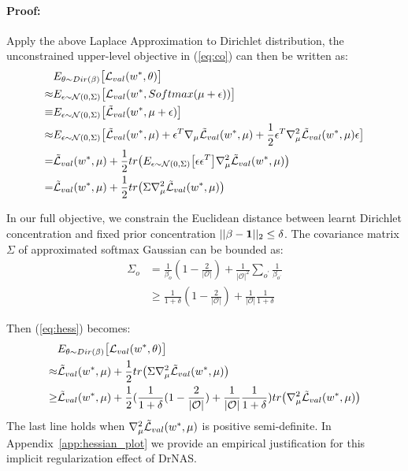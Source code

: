 \documentclass{article} \usepackage{iclr2021_conference,times}
\begin{document}
\paragraph{Proof:}
Apply the above Laplace Approximation to Dirichlet distribution, the unconstrained upper-level objective in (\ref{eq:co}) can then be written as:
\begin{align}
    \label{eq:hess}
    &E_{\theta \sim Dir(\beta)} \big{[}\mathcal{L}_{val} (w^*, \theta)\big{]}\\
    \approx &E_{\epsilon \sim \mathcal{N}(0, \Sigma)} \big{[}\mathcal{L}_{val} (w^*, Softmax(\mu + \epsilon))\big{]}\\
    \equiv &E_{\epsilon \sim \mathcal{N}(0, \Sigma)} \big{[}\mathcal{\Tilde{L}}_{val} (w^*, \mu + \epsilon)\big{]}\\
    \approx &E_{\epsilon \sim \mathcal{N}(0, \Sigma)} \big{[} \mathcal{\Tilde{L}}_{val} (w^*, \mu) + \epsilon^T \nabla_{\mu} \mathcal{\Tilde{L}}_{val} (w^*, \mu) + \frac{1}{2}\epsilon^T\nabla_{\mu}^2 \mathcal{\Tilde{L}}_{val} (w^*, \mu)\epsilon \big{]}\\
    = &\mathcal{\Tilde{L}}_{val} (w^*, \mu) + \frac{1}{2} tr\big{(}E_{\epsilon \sim \mathcal{N}(0, \Sigma)} \big{[} \epsilon\epsilon^T  \big{]} \nabla_{\mu}^2 \mathcal{\Tilde{L}}_{val} (w^*, \mu) \big{)}\\
    = &\mathcal{\Tilde{L}}_{val} (w^*, \mu) + \frac{1}{2} tr\big{(} \Sigma \nabla_{\mu}^2 \mathcal{\Tilde{L}}_{val} (w^*, \mu) \big{)}
\end{align}

In our full objective, we constrain the Euclidean distance between learnt Dirichlet concentration and fixed prior concentration $|| \beta - \bold{1} ||_2 \leq \delta$.
The covariance matrix $\Sigma$ of approximated softmax Gaussian can be bounded as:
\begin{align}
    \Sigma_o &= \frac{1}{\beta_o}(1 - \frac{2}{|\mathcal{O}|}) + \frac{1}{|\mathcal{O}|^2}\sum_{o^{'}} \frac{1}{\beta_{o^{'}}} \\
             &\geq \frac{1}{1 + \delta}(1 - \frac{2}{|\mathcal{O}|}) + \frac{1}{|\mathcal{O}|}\frac{1}{1 + \delta}
\end{align}

Then (\ref{eq:hess}) becomes:
\begin{align}
    &E_{\theta \sim Dir(\beta)} \big{[}\mathcal{L}_{val} (w^*, \theta)\big{]}\\
    \approx &\mathcal{\Tilde{L}}_{val} (w^*, \mu) + \frac{1}{2} tr\big{(} \Sigma \nabla_{\mu}^2 \mathcal{\Tilde{L}}_{val} (w^*, \mu) \big{)}\\
    \geq &\mathcal{\Tilde{L}}_{val} (w^*, \mu) + \frac{1}{2} (\frac{1}{1 + \delta}(1 - \frac{2}{|\mathcal{O}|}) + \frac{1}{|\mathcal{O}|}\frac{1}{1 + \delta}) tr\big{(} \nabla_{\mu}^2 \mathcal{\Tilde{L}}_{val} (w^*, \mu) \big{)}
\end{align}
The last line holds when $\nabla_{\mu}^2 \mathcal{\Tilde{L}}_{val} (w^*, \mu)$ is positive semi-definite.
In Appendix~\ref{app:hessian_plot} we provide an empirical justification for this implicit regularization effect of DrNAS.
\end{document}
